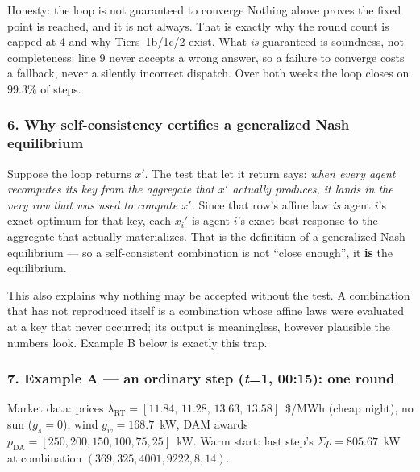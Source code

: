\documentclass[11pt, letterpaper]{article}
\begin{document}
\begin{warnbox}{Honesty: the loop is not guaranteed to converge}
Nothing above proves the fixed point is reached, and it is not always. That is exactly why the round
count is capped at 4 and why Tiers~1b/1c/2 exist. What \emph{is} guaranteed is soundness, not
completeness: line 9 never accepts a wrong answer, so a failure to converge costs a fallback, never a
silently incorrect dispatch. Over both weeks the loop closes on $99.3\%$ of steps.
\end{warnbox}

\subsubsection*{6. Why self-consistency certifies a generalized Nash equilibrium}
Suppose the loop returns $x'$. The test that let it return says: \emph{when every agent recomputes
its key from the aggregate that $x'$ actually produces, it lands in the very row that was used to
compute $x'$.} Since that row's affine law \emph{is} agent $i$'s exact optimum for that key, each
$x_i'$ is agent $i$'s exact best response to the aggregate that actually materializes. That is the
definition of a generalized Nash equilibrium --- so a self-consistent combination is not
``close enough'', it \textbf{is} the equilibrium.

This also explains why nothing may be accepted without the test. A combination that has not
reproduced itself is a combination whose affine laws were evaluated at a key that never occurred;
its output is meaningless, however plausible the numbers look. Example B below is exactly this trap.

\subsubsection*{7. Example A --- an ordinary step (\textit{t}=1, 00:15): one round}
Market data: prices $\lambda_{\mathrm{RT}}=[11.84,\,11.28,\,13.63,\,13.58]$~\$/MWh (cheap night), no
sun ($g_s=0$), wind $g_w=168.7$~kW, DAM awards $p_{\mathrm{DA}}=[250,200,150,100,75,25]$~kW.
Warm start: last step's $\Sigma p=805.67$~kW at combination $(369,325,4001,9222,8,14)$.
\end{document}
